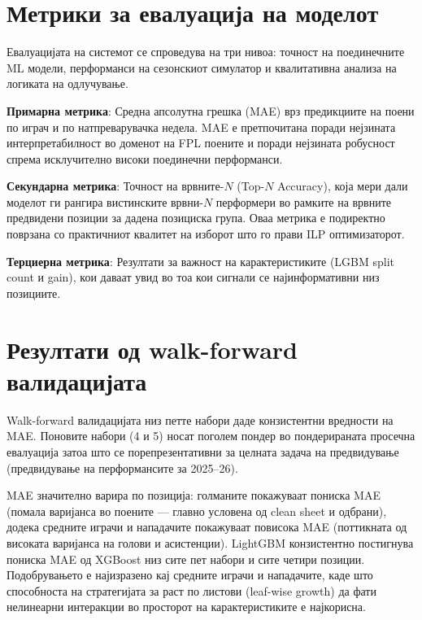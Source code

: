 
\section{Метрики за евалуација на моделот}

Евалуацијата на системот се спроведува на три нивоа: точност на поединечните ML модели, перформанси на сезонскиот симулатор и квалитативна анализа на логиката на одлучување.

\textbf{Примарна метрика}: Средна апсолутна грешка (MAE) врз предикциите на поени по играч и по натпреварувачка недела. MAE е претпочитана поради нејзината интерпретабилност во доменот на FPL поените и поради нејзината робусност спрема исклучително високи поединечни перформанси.

\textbf{Секундарна метрика}: Точност на врвните-$N$ (Top-$N$ Accuracy), која мери дали моделот ги рангира вистинските врвни-$N$ перформери во рамките на врвните предвидени позиции за дадена позициска група. Оваа метрика е подиректно поврзана со практичниот квалитет на изборот што го прави ILP оптимизаторот.

\textbf{Терциерна метрика}: Резултати за важност на карактеристиките (LGBM split count и gain), кои даваат увид во тоа кои сигнали се најинформативни низ позициите.

\section{Резултати од walk-forward валидацијата}

Walk-forward валидацијата низ петте набори даде конзистентни вредности на MAE. Поновите набори (4 и 5) носат поголем пондер во пондерираната просечна евалуација затоа што се порепрезентативни за целната задача на предвидување (предвидување на перформансите за 2025--26).

MAE значително варира по позиција: голманите покажуваат пониска MAE (помала варијанса во поените — главно условена од clean sheet и одбрани), додека средните играчи и нападачите покажуваат повисока MAE (поттикната од високата варијанса на голови и асистенции). LightGBM конзистентно постигнува пониска MAE од XGBoost низ сите пет набори и сите четири позиции. Подобрувањето е најизразено кај средните играчи и нападачите, каде што способноста на стратегијата за раст по листови (leaf-wise growth) да фати нелинеарни интеракции во просторот на карактеристиките е најкорисна.


